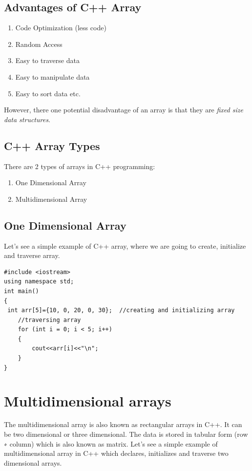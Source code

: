 \documentclass{book}
\begin{document}
\subsection{Advantages of C++ Array}

\begin{enumerate}
	\item Code Optimization (less code)
\item Random Access
\item Easy to traverse data
\item Easy to manipulate data
\item Easy to sort data etc.

\end{enumerate}

However, there one potential disadvantage of an array is that they are \textsl{fixed size data structures}. 

\subsection{C++ Array Types}

There are 2 types of arrays in C++ programming:

\begin{enumerate}
	\item One Dimensional Array
\item Multidimensional Array
\end{enumerate}

\subsection{One Dimensional Array}

Let's see a simple example of C++ array, where we are going to create, initialize and traverse array.

\begin{lstlisting}
#include <iostream>  
using namespace std;  
int main()  
{  
 int arr[5]={10, 0, 20, 0, 30};  //creating and initializing array    
	//traversing array    
	for (int i = 0; i < 5; i++)    
	{    
		cout<<arr[i]<<"\n";    
	}    
}  
\end{lstlisting}


\section{Multidimensional arrays}

The multidimensional array is also known as rectangular arrays in C++. It can be two dimensional or three dimensional. The data is stored in tabular form (row ∗ column) which is also known as matrix. Let's see a simple example of multidimensional array in C++ which declares, initializes and traverse two dimensional arrays.
\end{document}
